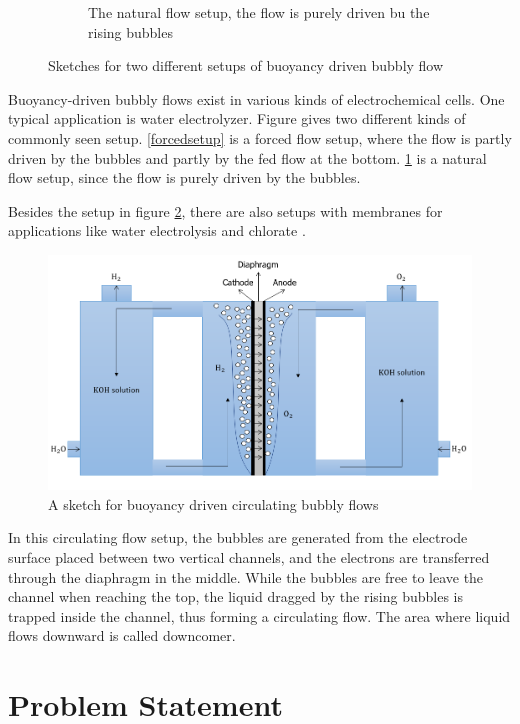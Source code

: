 \begin{figure}[H]
\begin{subfigure}{.4\textwidth}
  \caption{The natural flow setup, the flow is purely driven bu the rising bubbles}
  \label{naturalsetup}
\end{subfigure}
\caption{Sketches for two different setups of buoyancy driven bubbly flow}
\label{sketchcell}
\end{figure}

Buoyancy-driven bubbly flows exist in various kinds of electrochemical cells. One typical application is water electrolyzer. Figure \label{sketchcell} gives two different kinds of commonly seen setup. \ref{forcedsetup} is a forced flow setup, where the flow is partly driven by the bubbles and partly by the fed flow at the bottom. \ref{naturalsetup} is a natural flow setup, since the flow is purely driven by the bubbles.



Besides the setup in figure \ref{sketchcell}, there are also setups with membranes for applications like water electrolysis and chlorate \cite{Alexiadis2012b}. 

\begin{figure}[H]
    \centering
    \includegraphics[scale=0.6]{Circulatingsketch.png}
    \caption{A sketch for buoyancy driven circulating bubbly flows}
    \label{vertical}
\end{figure}


In this circulating flow setup, the bubbles are generated from the electrode surface placed between two vertical channels, and the electrons are transferred through the diaphragm in the middle. While the bubbles are free to leave the channel when reaching the top, the liquid dragged by the rising bubbles is trapped inside the channel, thus forming a circulating flow. The area where liquid flows downward is called downcomer.

\section{Problem Statement}

